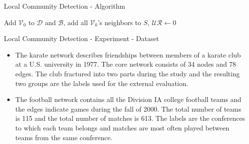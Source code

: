 \documentclass[9pt]{beamer}
\begin{document}
\begin{frame}{Local Community Detection - Algorithm}
  \scriptsize
\begin{algorithm}[H]
  Add $\mathcal{V}_0$ to $\mathcal{D}$ and $\mathcal{B}$, add all $\mathcal{V}_0$'s neighbors to $S$, $\mathcal{UR} \leftarrow 0$\;
  \caption{Local Community Identification with Edge Uncertainty}
   \end{algorithm}

\end{frame}


\begin{frame}{Local Community Detection - Experiment - Dataset}
\begin{itemize}
\item The karate network \cite{zachary1977information} describes friendships between members of a karate club at a U.S. university in 1977. The core network consists of 34 nodes and 78 edges. The club fractured into two parts during the study and the resulting two groups are the labels used for the external evaluation. 
\item The football network \cite{girvan2002community} contains all the Division IA college football teams and the edges indicate games during the fall of 2000. The total number of teams is 115 and the total number of matches is 613. The labels are the conferences to which each team belongs and matches are most often played between teams from the same conference. 
\end{itemize}

\end{frame}
\end{document}
